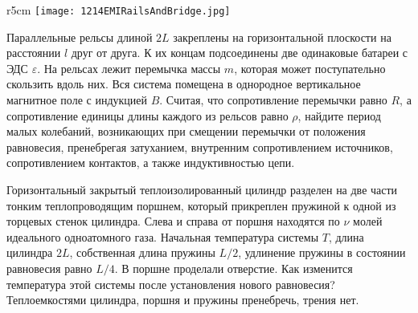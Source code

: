 \begin{wrapfigure}{r}{5cm}
\texttt{[image: 1214EMIRailsAndBridge.jpg]}
\end{wrapfigure}

\AddProb Параллельные рельсы длиной $2L$ закреплены на горизонтальной плоскости на расстоянии $l$ друг от друга. 
К их концам подсоединены две одинаковые батареи с ЭДС {\Large $\varepsilon$}. На рельсах лежит перемычка массы $m$, 
которая может поступательно скользить вдоль них. Вся система помещена в однородное вертикальное магнитное поле с индукцией $B$. 
Считая, что сопротивление перемычки равно $R$, а сопротивление единицы длины каждого из рельсов равно $\rho$, найдите период малых колебаний, 
возникающих при смещении перемычки от положения равновесия, пренебрегая затуханием, внутренним сопротивлением источников, 
сопротивлением контактов, а также индуктивностью цепи.

\AddProb Горизонтальный закрытый теплоизолированный цилиндр разделен на две части тонким теплопроводящим поршнем, 
который прикреплен пружиной к одной из торцевых стенок цилиндра. Слева и справа от поршня находятся по $\nu$ молей идеального одноатомного газа. 
Начальная температура системы $T$, длина цилиндра $2L$, собственная длина пружины $L/2$, удлинение пружины в состоянии равновесия равно $L/4$. 
В поршне проделали отверстие. Как изменится температура этой системы после установления нового равновесия? 
Теплоемкостями цилиндра, поршня и пружины пренебречь, трения нет.